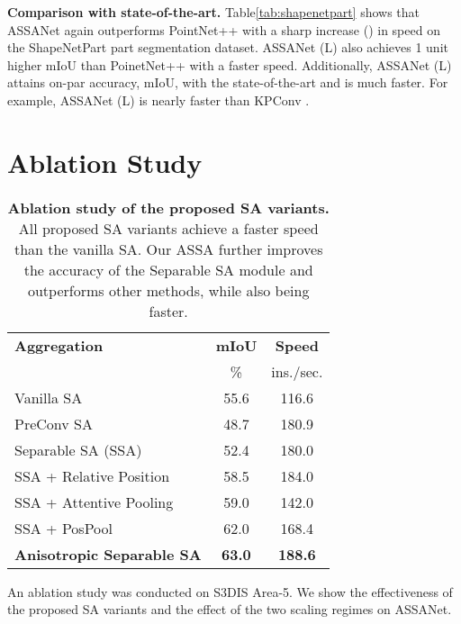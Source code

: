 \documentclass{article}
\newcommand{\tblLabel}{Table\xspace}
\newcommand{\mysection}[1]{\vspace{3pt}\noindent\textbf{#1.}}
\begin{document}
\mysection{Comparison with state-of-the-art}
\tblLabel \ref{tab:shapenetpart} shows that ASSANet again outperforms PointNet++ with a sharp increase () in speed on the ShapeNetPart part segmentation dataset. ASSANet (L) also achieves 1 unit higher mIoU than PoinetNet++ with a  faster speed. Additionally, ASSANet (L) attains on-par accuracy,  mIoU, with the state-of-the-art and is much faster. For example, ASSANet (L) is nearly  faster than KPConv \cite{Thomas2019KPConvFA}. 
 \section{Ablation Study}
\begin{wraptable}{r}{7.5cm}
\vspace{-15mm}
\begin{center}
\begin{tabular}{lcc}
\midrule
\textbf{Aggregation} & \textbf{mIoU} & \textbf{Speed} \\
& \% & ins./sec.\\
\midrule
Vanilla SA & 55.6 &  116.6\\
PreConv SA & 48.7 &  180.9\\
Separable SA (SSA) & 52.4 & 180.0 \\ 
SSA + Relative Position & 58.5 & 184.0 \\ 
SSA + Attentive Pooling\cite{Hu2020RandLANetES} & 59.0 & 142.0 \\ 
SSA + PosPool\cite{Liu2020ACL} &62.0 & 168.4 \\ 
\textbf{Anisotropic Separable SA
} & \textbf{63.0} & \textbf{188.6} \\ 
\bottomrule
\end{tabular}
\end{center}
\caption{\textbf{Ablation study of the proposed SA variants.} All proposed SA variants achieve a faster speed than the vanilla SA. Our ASSA further improves the accuracy of the Separable SA module and outperforms other methods, while also being faster.  
}
\label{tab:abalation_sa}
\vspace{-10mm}
\end{wraptable}

An ablation study was conducted on S3DIS \cite{s3dis} Area-5. We show the effectiveness of the proposed SA variants and the effect of the two scaling regimes on ASSANet. 
\end{document}
